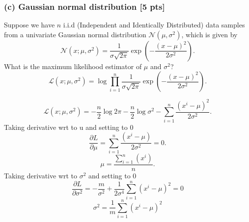 \documentclass[twoside,10pt]{article}
\begin{document}
\subsubsection*{(c) Gaussian normal distribution [5 pts]}
Suppose we have $n$ i.i.d (Independent and Identically Distributed)
data samples from a univariate Gaussian normal distribution
$\mathcal{N}(\mu, \sigma^2)$, which is given by
\begin{equation}
\mathcal{N}(x; \mu, \sigma^2) = \frac{1}{\sigma \sqrt{2\pi}} \exp
\left( - \frac{(x - \mu)^2}{2\sigma^2} \right).\nonumber
\end{equation}
What is the maximum likelihood estimator of $\mu$ and $\sigma^2$?
\begin{equation}
\mathcal{L}(x; \mu, \sigma^2) = \log \prod_{i=1}^n \frac{1}{\sigma \sqrt{2\pi}} \exp
\left( - \frac{(x - \mu)^2}{2\sigma^2} \right).\nonumber
\end{equation}

\begin{equation}
\mathcal{L}(x; \mu, \sigma^2) = -\frac{n}{2}\log 2\pi   -\frac{n}{2}\log \sigma^2 - \sum_{i=1}^n  \frac{(x^i - \mu)^2}{2\sigma^2}.\nonumber
\end{equation}
Taking derivative wrt to u and setting to 0
\begin{equation}
\frac{\partial L}{\partial \mu} = \sum_{i=1}^n  \frac{(x^i - \mu)}{2\sigma^2} = 0.\nonumber
\end{equation}
\begin{equation}
 \mu =\frac{ \sum_{i=1}^n (x^i )}{n} .\nonumber
\end{equation}
Taking derivative wrt to $\sigma^2$ and setting to 0
\begin{equation}
\frac{\partial L}{\partial\sigma^2} =-\frac{m}{\sigma^2} + \frac{1}{2\sigma^4}  \sum_{i=1}^n (x^i - \mu)^2 = 0\nonumber
\end{equation}
\begin{equation}
\sigma^2 =\frac{1}{m}\sum_{i=1}^n (x^i - \mu)^2\nonumber
\end{equation}
\vspace{1cm}

\end{document}
